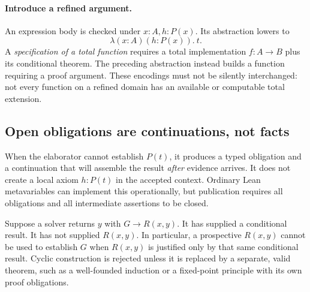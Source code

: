 \documentclass[11pt,letterpaper]{article}
\theoremstyle{definition}
\theoremstyle{remark}
\begin{document}
\paragraph{Introduce a refined argument.}
An expression body is checked under $x:A,h:P(x)$. Its abstraction lowers to
\[
                \lambda (x:A)(h:P(x)).\ t.
\]
A \emph{specification of a total function} requires a total implementation
$f:A\to B$ plus its conditional theorem. The preceding abstraction instead
builds a function requiring a proof argument. These encodings must not be
silently interchanged: not every function on a refined domain has an available
or computable total extension.

\subsection{Open obligations are continuations, not facts}
When the elaborator cannot establish $P(t)$, it produces a typed obligation and
a continuation that will assemble the result \emph{after} evidence arrives.
It does not create a local axiom $h:P(t)$ in the accepted context. Ordinary Lean
metavariables can implement this operationally, but publication requires all
obligations and all intermediate assertions to be closed.

Suppose a solver returns $y$ with $G\to R(x,y)$. It has supplied a conditional
result. It has not supplied $R(x,y)$. In particular, a prospective $R(x,y)$
cannot be used to establish $G$ when $R(x,y)$ is justified only by that same
conditional result. Cyclic construction is rejected unless it is replaced by a
separate, valid theorem, such as a well-founded induction or a fixed-point
principle with its own proof obligations.
\end{document}
